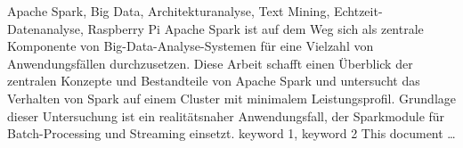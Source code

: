 \documentclass[draft=false
              ,paper=a4
              ,twoside=false
              ,fontsize=11pt
              ,headsepline
              ,BCOR10mm
              ,DIV11
              ]{scrbook}
\begin{document}


\frontmatter

\maketitle

\onehalfspacing

\HAWAbstractPage
{Apache Spark, Big Data, Architekturanalyse, Text Mining, Echtzeit-Datenanalyse, Raspberry Pi}%
{Apache Spark ist auf dem Weg sich als zentrale Komponente von Big-Data-Analyse-Systemen für eine Vielzahl von Anwendungsfällen durchzusetzen. Diese Arbeit schafft einen Überblick der zentralen Konzepte und Bestandteile von Apache Spark und untersucht das Verhalten von Spark auf einem Cluster mit minimalem Leistungsprofil. Grundlage dieser Untersuchung ist ein realitätsnaher Anwendungsfall, der Sparkmodule für Batch-Processing und Streaming einsetzt.}
{keyword 1, keyword 2}%
{This document \ldots}

\newpage
\singlespacing

\tableofcontents

\newpage
\listoffigures
\listoftables
\lstlistoflistings

\mainmatter
\onehalfspacing




%


\backmatter


\newpage
\glstoctrue
\printglossary[title=Acronyme,toctitle=Acronyme,type=\acronymtype]
\printglossary[title=Glossar, toctitle=Glossar]
\end{document}
